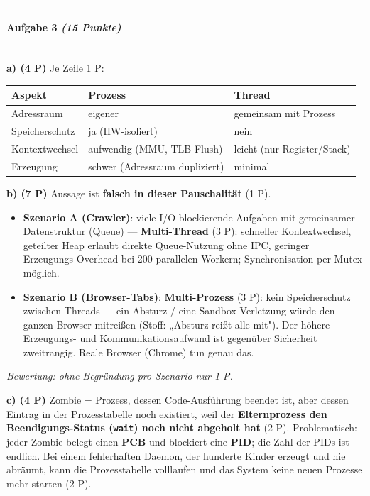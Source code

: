 \documentclass[11pt, a4paper]{article}
\begin{document}
\noindent\textcolor{rulegray}{\rule{\linewidth}{0.4pt}}


\paragraph{Aufgabe 3 \textit{(15 Punkte)}}\mbox{}\\[2pt]

\textbf{a) (4 P)} Je Zeile 1 P:



{\small
\begin{tabularx}{\linewidth}{XXX}
\hline
\rowcolor{tableheadbg}
{\color{white}\textbf{Aspekt}} & {\color{white}\textbf{Prozess}} & {\color{white}\textbf{Thread}} \\[2pt]
\hline
\endhead
\hline
\endfoot
Adressraum & eigener & gemeinsam mit Prozess \\
Speicherschutz & ja (HW-isoliert) & nein \\
Kontextwechsel & aufwendig (MMU, TLB-Flush) & leicht (nur Register/Stack) \\
Erzeugung & schwer (Adressraum dupliziert) & minimal \\
\end{tabularx}
}


\textbf{b) (7 P)} Aussage ist \textbf{falsch in dieser Pauschalität} (1 P).

\begin{itemize}
  \item \textbf{Szenario A (Crawler)}: viele I/O-blockierende Aufgaben mit gemeinsamer Datenstruktur (Queue) — \textbf{Multi-Thread} (3 P): schneller Kontextwechsel, geteilter Heap erlaubt direkte Queue-Nutzung ohne IPC, geringer Erzeugungs-Overhead bei 200 parallelen Workern; Synchronisation per Mutex möglich.
  \item \textbf{Szenario B (Browser-Tabs)}: \textbf{Multi-Prozess} (3 P): kein Speicherschutz zwischen Threads — ein Absturz / eine Sandbox-Verletzung würde den ganzen Browser mitreißen (Stoff: „Absturz reißt alle mit"). Der höhere Erzeugungs- und Kommunikationsaufwand ist gegenüber Sicherheit zweitrangig. Reale Browser (Chrome) tun genau das.
\end{itemize}

\textit{Bewertung: ohne Begründung pro Szenario nur 1 P.}


\textbf{c) (4 P)} Zombie = Prozess, dessen Code-Ausführung beendet ist, aber dessen Eintrag in der Prozesstabelle noch existiert, weil der \textbf{Elternprozess den Beendigungs-Status (\texttt{wait}) noch nicht abgeholt hat} (2 P). Problematisch: jeder Zombie belegt einen \textbf{PCB} und blockiert eine \textbf{PID}; die Zahl der PIDs ist endlich. Bei einem fehlerhaften Daemon, der hunderte Kinder erzeugt und nie abräumt, kann die Prozesstabelle volllaufen und das System keine neuen Prozesse mehr starten (2 P).
\end{document}
